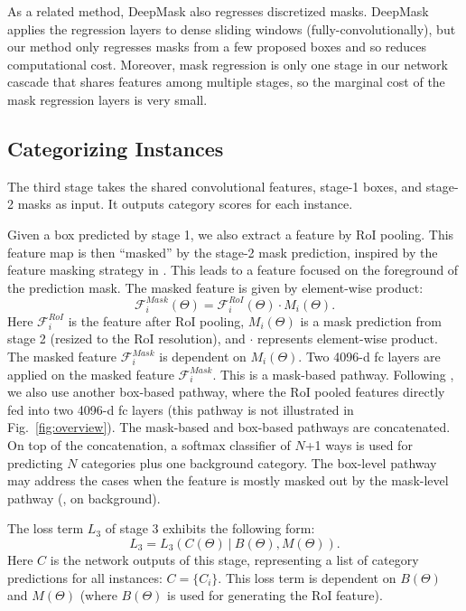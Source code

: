 \documentclass[10pt,twocolumn,letterpaper]{article}
\begin{document}
As a related method, DeepMask \cite{Pinheiro2015} also regresses discretized masks. DeepMask applies the regression layers to dense sliding windows (fully-convolutionally), but our method only regresses masks from a few proposed boxes and so reduces computational cost.
Moreover, mask regression is only one stage in our network cascade that shares features among multiple stages, so the marginal cost of the mask regression layers is very small.

\subsection{Categorizing Instances}

The third stage takes the shared convolutional features, stage-1 boxes, and stage-2 masks as input. It outputs category scores for each instance.

Given a box predicted by stage 1, we also extract a feature by RoI pooling. This feature map is then ``masked'' by the stage-2 mask prediction, inspired by the feature masking strategy in \cite{Dai2015}. This leads to a feature focused on the foreground of the prediction mask.
The masked feature is given by element-wise product:
\begin{equation}\label{eq:masking}
\mathcal{F}^{Mask}_i(\Theta)=\mathcal{F}^{RoI}_i(\Theta)\cdot M_i(\Theta).
\end{equation}
Here $\mathcal{F}^{RoI}_i$ is the feature after RoI pooling, $M_i(\Theta)$ is a mask prediction from stage 2 (resized to the RoI resolution), and $\cdot$ represents element-wise product. The masked feature $\mathcal{F}^{Mask}_i$ is dependent on $M_i(\Theta)$.
Two 4096-d fc layers are applied on the masked feature $\mathcal{F}^{Mask}_i$. This is a mask-based pathway. Following \cite{Hariharan2014}, we also use another box-based pathway, where the RoI pooled features directly fed into two 4096-d fc layers (this pathway is not illustrated in Fig.~\ref{fig:overview}). The mask-based and box-based pathways are concatenated. On top of the concatenation, a softmax classifier of $N$+1 ways is used for predicting $N$ categories plus one background category. The box-level pathway may address the cases when the feature is mostly masked out by the mask-level pathway (\eg, on background).


The loss term $L_3$ of stage 3 exhibits the following form:
\begin{equation}\label{eq:L3}
L_3 = L_3(C(\Theta) ~|~B(\Theta), M(\Theta)).
\end{equation}
Here $C$ is the network outputs of this stage, representing a list of category predictions for all instances: $C=\{C_i\}$. This loss term is dependent on $B(\Theta)$ and $M(\Theta)$ (where $B(\Theta)$ is used for generating the RoI feature).
\end{document}
